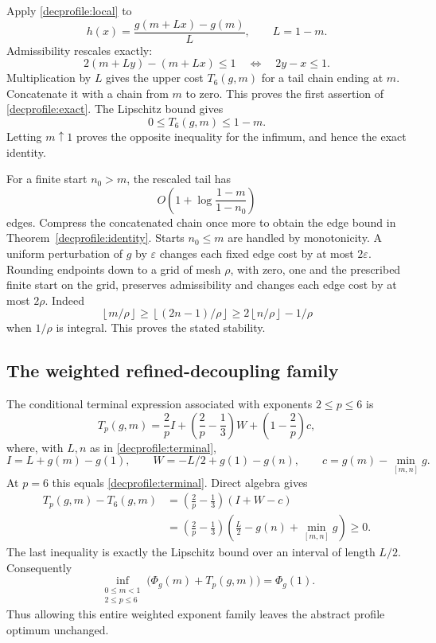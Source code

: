 Apply \eqref{decprofile:local} to
\[
 h(x)=\frac{g(m+Lx)-g(m)}{L},\qquad L=1-m.
\]
Admissibility rescales exactly:
\[
 2(m+Ly)-(m+Lx)\le1\quad\Longleftrightarrow\quad 2y-x\le1.
\]
Multiplication by \(L\) gives the upper cost \(T_6(g,m)\) for a tail
chain ending at \(m\). Concatenate it with a chain from \(m\) to zero.
This proves the first assertion of \eqref{decprofile:exact}.
The Lipschitz bound gives
\[
 0\le T_6(g,m)\le1-m.
\]
Letting \(m\uparrow1\) proves the opposite inequality for the infimum,
and hence the exact identity.

For a finite start \(n_0>m\), the rescaled tail has
\[
 O\left(1+\log\frac{1-m}{1-n_0}\right)
\]
edges. Compress the concatenated chain once more to obtain the edge
bound in Theorem~\ref{decprofile:identity}. Starts \(n_0\le m\) are
handled by monotonicity. A uniform perturbation of \(g\) by
\(\varepsilon\) changes each fixed edge cost by at most \(2\varepsilon\).
Rounding endpoints down to a grid of mesh \(\rho\), with zero, one and
the prescribed finite start on the grid, preserves admissibility and changes each edge cost by at
most \(2\rho\). Indeed
\[
 \left\lfloor m/\rho\right\rfloor
 \ge\left\lfloor(2n-1)/\rho\right\rfloor
 \ge2\left\lfloor n/\rho\right\rfloor-1/\rho
\]
when \(1/\rho\) is integral. This proves the stated stability.

\subsection{The weighted refined-decoupling family}
\label{decprofile:weighted}

The conditional terminal expression associated with exponents
\(2\le p\le6\) is
\[
 T_p(g,m)=\frac2p I+
       \left(\frac2p-\frac13\right)W+
       \left(1-\frac2p\right)c,
\]
where, with \(L,n\) as in \eqref{decprofile:terminal},
\[
 I=L+g(m)-g(1),\qquad
 W=-L/2+g(1)-g(n),\qquad
 c=g(m)-\min_{[m,n]}g.
\]
At \(p=6\) this equals \eqref{decprofile:terminal}. Direct algebra gives
\begin{align*}
 T_p(g,m)-T_6(g,m)
 &=\left(\frac2p-\frac13\right)(I+W-c)\\
 &=\left(\frac2p-\frac13\right)
       \left(\frac L2-g(n)+\min_{[m,n]}g\right)\ge0.
\end{align*}
The last inequality is exactly the Lipschitz bound over an interval of
length \(L/2\). Consequently
\[
 \inf_{\substack{0\le m<1\\2\le p\le6}}
       \bigl(\Phi_g(m)+T_p(g,m)\bigr)=\Phi_g(1).
\]
Thus allowing this entire weighted exponent family leaves the abstract
profile optimum unchanged.
